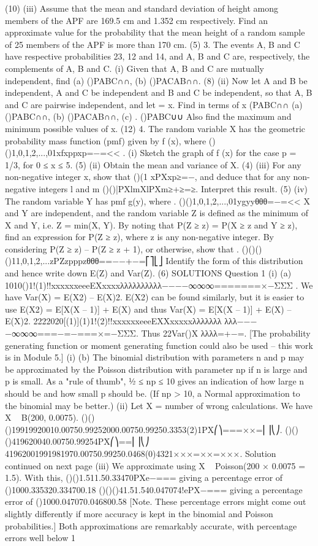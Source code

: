 (10)
(iii) Assume that the mean and standard deviation of height among members of the APF are 169.5 cm and 1.352 cm respectively. Find an approximate value for the probability that the mean height of a random sample of 25 members of the APF is more than 170 cm.
(5)
3. The events A, B and C have respective probabilities 23, 12 and 14, and A, B and C are, respectively, the complements of A, B and C.
(i) Given that A, B and C are mutually independent, find
(a) ()PABC∩∩,
(b) ()PACAB∩∩.
(8)
(ii) Now let A and B be independent, A and C be independent and B and C be independent, so that A, B and C are pairwise independent, and let = x. Find in terms of x (PABC∩∩
(a) ()PABC∩∩,
(b) ()PACAB∩∩,
(c) . ()PABC∪∪
Also find the maximum and minimum possible values of x.
(12)
4. The random variable X has the geometric probability mass function (pmf) given by f (x), where ()()1,0,1,2,...,01xfxppxp=−=<< .
(i) Sketch the graph of f (x) for the case p = 1/3, for 0 ≤ x ≤ 5.
(5)
(ii) Obtain the mean and variance of X.
(4)
(iii) For any non-negative integer x, show that ()(1 xPXxp≥=−, and deduce that for any non-negative integers l and m ()()|PXlmXlPXm≥+≥=≥.
Interpret this result.
(5)
(iv) The random variable Y has pmf g(y), where
. ()()1,0,1,2,...,01ygyyθθθ=−=<<
X and Y are independent, and the random variable Z is defined as the minimum of X and Y, i.e. Z = min(X, Y). By noting that P(Z ≥ z) = P(X ≥ z and Y ≥ z), find an expression for P(Z ≥ z), where z is any non-negative integer. By considering P(Z ≥ z) – P(Z ≥ z + 1), or otherwise, show that
. ()()()()11,0,1,2,...zPZzpppzθθθ==−−+−=⎡⎤⎣⎦
Identify the form of this distribution and hence write down E(Z) and Var(Z).
(6)
SOLUTIONS
Question 1
(i) (a) 1010()1!(1)!!xxxxxxeeeEXxxxxλλλλλλλλλλ−−−−∞∞∞=======×−ΣΣΣ .
We have Var(X) = E(X2) – {E(X)}2. E(X2) can be found similarly, but it is easier to use E(X2) = E[X(X – 1)] + E(X) and thus Var(X) = E[X(X – 1)] + E(X) – {E(X)}2. 2222020[(1)](1)1!(2)!!xxxxxxeeeEXXxxxxxλλλλλλλ λλλ−−−−∞∞∞===−=−===×=−ΣΣΣ.
Thus 22Var()X λλλλ=+−=.
[The probability generating function or moment generating function could also be used – this work is in Module 5.]
(i) (b) The binomial distribution with parameters n and p may be approximated by the Poisson distribution with parameter np if n is large and p is small. As a "rule of thumb", ½ ≤ np ≤ 10 gives an indication of how large n should be and how small p should be. (If np > 10, a Normal approximation to the binomial may be better.)
(ii) Let X = number of wrong calculations. We have X ~ B(200, 0.0075).
()()()19919920010.00750.99252000.00750.99250.3353(2)1PX⎛⎞===××=⎜⎟⎝⎠.
()()()419620040.00750.99254PX⎛⎞==⎜⎟⎝⎠ 41962001991981970.00750.99250.0468(0)4321×××=××=×××.
Solution continued on next page
(iii) We approximate using X ~ Poisson(200 × 0.0075 = 1.5). With this,
()()1.511.50.33470PXe−===
giving a percentage error of ()1000.335320.334700.18%
()()()41.51.540.047074!ePX−===
giving a percentage error of ()1000.047070.046800.58%
[Note. These percentage errors might come out slightly differently if more accuracy is kept in the binomial and Poisson probabilities.]
Both approximations are remarkably accurate, with percentage errors well below 1%
